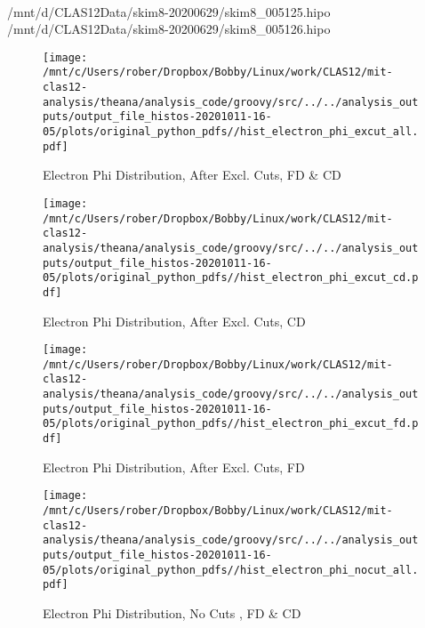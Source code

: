 \documentclass{article}
\begin{document}
\\/mnt/d/CLAS12Data/skim8-20200629/skim8\_005125.hipo 
\\/mnt/d/CLAS12Data/skim8-20200629/skim8\_005126.hipo 
\\\clearpage 
\listoffigures
\clearpage
\begin{landscape}

    \begin{figure}[h]
        \centering

        \texttt{[image: /mnt/c/Users/rober/Dropbox/Bobby/Linux/work/CLAS12/mit-clas12-analysis/theana/analysis\_code/groovy/src/../../analysis\_outputs/output\_file\_histos-20201011-16-05/plots/original\_python\_pdfs//hist\_electron\_phi\_excut\_all.pdf]}
        \captionsetup{textformat=empty,labelformat=blank}
        \caption{Electron Phi Distribution, After Excl. Cuts, FD \& CD}
    \end{figure}
    \clearpage
    
    \begin{figure}[h]
        \centering

        \texttt{[image: /mnt/c/Users/rober/Dropbox/Bobby/Linux/work/CLAS12/mit-clas12-analysis/theana/analysis\_code/groovy/src/../../analysis\_outputs/output\_file\_histos-20201011-16-05/plots/original\_python\_pdfs//hist\_electron\_phi\_excut\_cd.pdf]}
        \captionsetup{textformat=empty,labelformat=blank}
        \caption{Electron Phi Distribution, After Excl. Cuts, CD}
    \end{figure}
    \clearpage
    
    \begin{figure}[h]
        \centering

        \texttt{[image: /mnt/c/Users/rober/Dropbox/Bobby/Linux/work/CLAS12/mit-clas12-analysis/theana/analysis\_code/groovy/src/../../analysis\_outputs/output\_file\_histos-20201011-16-05/plots/original\_python\_pdfs//hist\_electron\_phi\_excut\_fd.pdf]}
        \captionsetup{textformat=empty,labelformat=blank}
        \caption{Electron Phi Distribution, After Excl. Cuts, FD}
    \end{figure}
    \clearpage
    
    \begin{figure}[h]
        \centering

        \texttt{[image: /mnt/c/Users/rober/Dropbox/Bobby/Linux/work/CLAS12/mit-clas12-analysis/theana/analysis\_code/groovy/src/../../analysis\_outputs/output\_file\_histos-20201011-16-05/plots/original\_python\_pdfs//hist\_electron\_phi\_nocut\_all.pdf]}
        \captionsetup{textformat=empty,labelformat=blank}
        \caption{Electron Phi Distribution, No Cuts , FD \& CD}
    \end{figure}
    \clearpage
    

\end{landscape}
\end{document}
